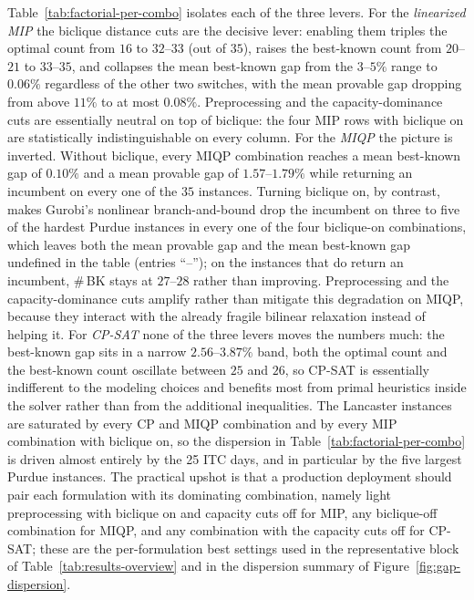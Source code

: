 \documentclass[11pt]{article}
\begin{document}
Table~\ref{tab:factorial-per-combo} isolates each of the three levers. For the \emph{linearized MIP} the biclique distance cuts are the decisive lever: enabling them triples the optimal count from $16$ to $32$--$33$ (out of $35$), raises the best-known count from $20$--$21$ to $33$--$35$, and collapses the mean best-known gap from the $3$--$5\%$ range to $0.06\%$ regardless of the other two switches, with the mean provable gap dropping from above $11\%$ to at most $0.08\%$. Preprocessing and the capacity-dominance cuts are essentially neutral on top of biclique: the four MIP rows with biclique on are statistically indistinguishable on every column. For the \emph{MIQP} the picture is inverted. Without biclique, every MIQP combination reaches a mean best-known gap of $0.10\%$ and a mean provable gap of $1.57$--$1.79\%$ while returning an incumbent on every one of the $35$ instances. Turning biclique on, by contrast, makes Gurobi's nonlinear branch-and-bound drop the incumbent on three to five of the hardest Purdue instances in every one of the four biclique-on combinations, which leaves both the mean provable gap and the mean best-known gap undefined in the table (entries ``--''); on the instances that do return an incumbent, $\#\,$BK stays at $27$--$28$ rather than improving. Preprocessing and the capacity-dominance cuts amplify rather than mitigate this degradation on MIQP, because they interact with the already fragile bilinear relaxation instead of helping it. For \emph{CP-SAT} none of the three levers moves the numbers much: the best-known gap sits in a narrow $2.56$--$3.87\%$ band, both the optimal count and the best-known count oscillate between $25$ and $26$, so CP-SAT is essentially indifferent to the modeling choices and benefits most from primal heuristics inside the solver rather than from the additional inequalities. The Lancaster instances are saturated by every CP and MIQP combination and by every MIP combination with biclique on, so the dispersion in Table~\ref{tab:factorial-per-combo} is driven almost entirely by the 25 ITC days, and in particular by the five largest Purdue instances. The practical upshot is that a production deployment should pair each formulation with its dominating combination, namely light preprocessing with biclique on and capacity cuts off for MIP, any biclique-off combination for MIQP, and any combination with the capacity cuts off for CP-SAT; these are the per-formulation best settings used in the representative block of Table~\ref{tab:results-overview} and in the dispersion summary of Figure~\ref{fig:gap-dispersion}.
\end{document}
